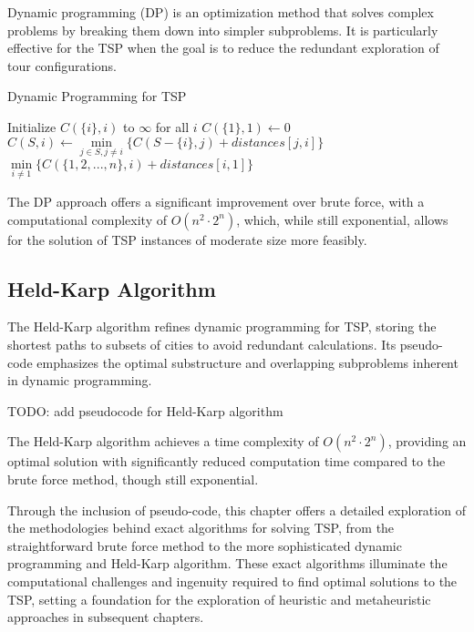 Dynamic programming (DP) is an optimization method that solves complex problems by breaking them down into simpler subproblems. It is particularly effective for the TSP when the goal is to reduce the redundant exploration of tour configurations.
\begin{algorithm}
	\caption{Dynamic Programming for TSP}\label{dynamicprogramming}
	\begin{algorithmic}[1]
		\State Initialize $C(\{i\}, i)$ to $\infty$ for all $i$
		\State $C(\{1\}, 1) \gets 0$ 
		\State $C(S, i) \gets \min\limits_{j \in S, j \neq i}\{C(S-\{i\}, j) + distances[j, i]\}$
		\EndFor
		\EndFor
		\EndFor
		\State \Return $\min\limits_{i \neq 1}\{C(\{1,2,...,n\}, i) + distances[i, 1]\}$
		\EndProcedure
	\end{algorithmic}
\end{algorithm}

The DP approach offers a significant improvement over brute force, with a computational complexity of $O(n^2 \cdot 2^n)$, which, while still exponential, allows for the solution of TSP instances of moderate size more feasibly.

\subsection{Held-Karp Algorithm}

The Held-Karp algorithm refines dynamic programming for TSP, storing the shortest paths to subsets of cities to avoid redundant calculations. Its pseudo-code emphasizes the optimal substructure and overlapping subproblems inherent in dynamic programming.

TODO: add pseudocode for Held-Karp algorithm

The Held-Karp algorithm achieves a time complexity of $O(n^2 \cdot 2^n)$, providing an optimal solution with significantly reduced computation time compared to the brute force method, though still exponential.

Through the inclusion of pseudo-code, this chapter offers a detailed exploration of the methodologies behind exact algorithms for solving TSP, from the straightforward brute force method to the more sophisticated dynamic programming and Held-Karp algorithm. These exact algorithms illuminate the computational challenges and ingenuity required to find optimal solutions to the TSP, setting a foundation for the exploration of heuristic and metaheuristic approaches in subsequent chapters.


